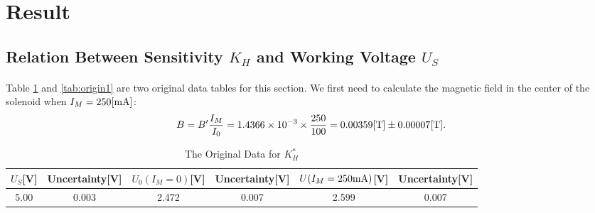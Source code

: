 \documentclass[a4paper]{article}
\begin{document}
    \section{Result}
    \subsection{Relation Between Sensitivity \(K_H\) and Working Voltage \(U_S\)}\label{sec:1}
    \paragraph{} Table \ref{tab:KH*} and \ref{tab:origin1} are two original data tables for this section. We first need to calculate the magnetic field in the center of the solenoid when $I_M=250[\rm mA]$: $$B=B'\frac{I_M}{I_0}=1.4366\times 10^{-3}\times \frac{250}{100}=0.00359[\rm T]\pm 0.00007[T].$$ 
    \begin{table}[H]
        \centering
        \begin{tabular}{|c|c|c|c|c|c|}
            \hline
            $U_S$[V]&Uncertainty[V]&$U_0(I_M=0)$[V]&Uncertainty[V]&$U(I_M=250\rm mA)$[V]&Uncertainty[V]\\\hline
            5.00&0.003&2.472&0.007&2.599&0.007\\\hline
        \end{tabular}
        \caption{The Original Data for $K_H^*$}
        \label{tab:KH*}
    \end{table}
\end{document}
